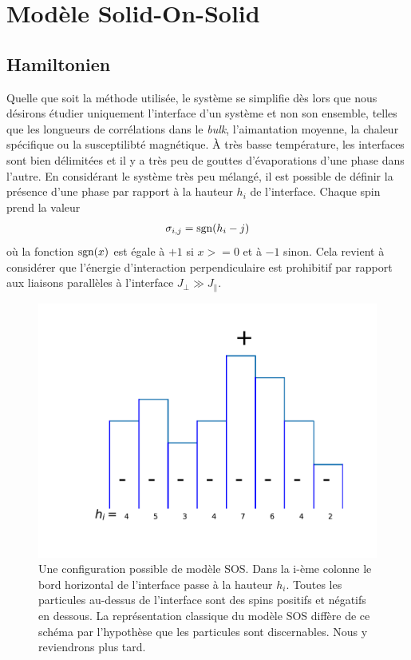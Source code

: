\chapter{Modèle Solid-On-Solid}
		
		\section{Hamiltonien}
	
Quelle que soit la méthode utilisée, le système se simplifie dès lors que nous désirons étudier uniquement l'interface d'un système et non son ensemble, telles que les longueurs de corrélations dans le \textit{bulk}, l'aimantation moyenne, la chaleur spécifique ou la susceptilibté magnétique. À très basse température, les interfaces sont bien délimitées et il y a très peu de gouttes d'évaporations d'une phase dans l'autre. En considérant le système très peu mélangé, il est possible de définir la présence d'une phase par rapport à la hauteur $h_i$ de l'interface. Chaque spin prend la valeur
\begin{align*}
	\sigma_{i,j} = \operatorname{sgn}(h_i-j)
\end{align*}
où la fonction $\operatorname{sgn}(x)$ est égale à $+1$ si $x>=0$ et à $-1$ sinon. Cela revient à considérer que l'énergie d'interaction perpendiculaire est prohibitif par rapport aux liaisons parallèles à l'interface $J_\perp \gg J_\parallel$. 

\begin{figure}
	\centering
	\includegraphics[scale=1]{isingtosos/sos-indiscernable.pdf}
	\caption{Une configuration possible de modèle SOS. Dans la i-ème colonne le bord horizontal de l'interface passe à la hauteur $h_i$. Toutes les particules au-dessus de l'interface sont des spins positifs et négatifs en dessous. La représentation classique du modèle SOS diffère de ce schéma par l'hypothèse que les particules sont discernables. Nous y reviendrons plus tard.}
\end{figure}


